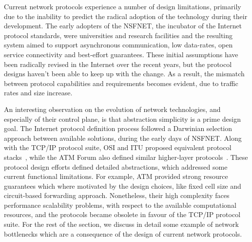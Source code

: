 Current network protocols experience a number of design limitations, primarily
due to the inability to predict the radical adoption of the technology during
their development.  The early adopters of the NSFNET, the incubator  of the
Internet protocol standards, were universities and research facilities and the
resulting system aimed to support asynchronous communication, low data-rates,
open service connectivity and best-effort guarantees. These initial assumptions
have been radically revised in the Internet over the recent years, but the
protocol designs haven't been able to keep up with the change. As a result, the
mismatch between protocol capabilities and requirements becomes evident, due to
traffic rates and size increase.

An interesting observation on the evolution of network technologies, and
especially of their control plane, is that abstraction simplicity is a prime
design goal. The Internet protocol definition process followed a
Darwinian selection approach between available solutions, during the early days
of NSFNET\@. Along with the TCP/IP protocol suite, OSI and ITU proposed
equivalent protocol stacks~\cite{x.213,x.233}, while the ATM Forum also defined
similar higher-layer protocols~\cite{Siu95}. These protocol design efforts
defined detailed abstractions, which addressed some current functional
limitations.  For example, ATM provided strong resource guarantees which where
motivated by the design choices, like fixed cell size and 
circuit-based forwarding approach.  Nonetheless, their high complexity
faces performance scalability problems, with respect to the available
computational resources, and the protocols became obsolete in favour of the
TCP/IP protocol suite. For the rest of the section, we discuss in detail some
example of network bottlenecks which are a consequence of the design of current
network protocols.

